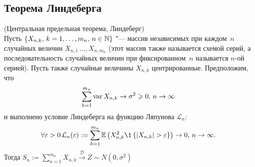 \subsection{Теорема Линдеберга}
\begin{theorem}\label{lect13:theorem1}
(Центральная предельная теорема, Линдеберг)\\
Пусть $\{X_{n, k}, \,k = 1, \ldots, m_n, \, n \in \mathbb{N}\}$ "--- массив независимых при каждом~$n$ случайных величин $X_{n, 1} \, \ldots , X_{n, m_n}$ (этот массив также называется схемой серий, а последовательность случайных величин при фиксированном~$n$ называется $n$-ой серией). Пусть также случайные величины $X_{n, k}$ центрированные. Предположим, что
$$
\sum_{k = 1}^{m_n}\operatorname*{var} X_{n, k} \to \sigma^2 \geqslant 0, \, n\to \infty
$$
и выполнено условие Линдеберга на функцию Ляпунова $\mathcal{L}_n$:
$$
\forall \eps > 0 \, \mathcal{L}_n(\eps) := \sum_{k = 1}^{m_n}\E\left(X_{n, k}^2 \1\left\{\left|X_{n, k}\right| > \eps\right\}\right) \to 0, \, n \to \infty.
$$
Тогда $S_n := \sum\limits_{n = 1}^{m_n}X_{n, k} \overset{\mathcal{D}}{\to} Z \sim N(0, \sigma^2)$
\end{theorem}
